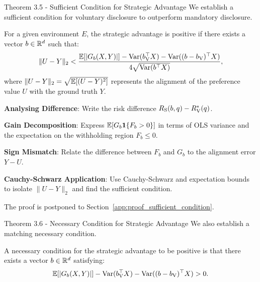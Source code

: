\begin{faqblock}
\faqanswers
{}
\end{faqblock}

\begin{sourceblock}{Theorem 3.5 - Sufficient Condition for Strategic Advantage}
We establish a sufficient condition for voluntary disclosure to outperform mandatory disclosure.
\begin{theorem}
\label{thm:sufficient_condition}
For a given environment $E$, the strategic advantage is positive if there exists a vector $b \in \mathbb{R}^d$ such that:
\begin{equation}
    \label{eq:sufficient_condition}
    \|U - Y\|_2 < \frac{\mathbb{E}[|G_b(X, Y)|] - \mathrm{Var}(b_{\mathrm{V}}^\top X) - \mathrm{Var}((b - b_{\mathrm{V}})^\top X)}{4\sqrt{\mathrm{Var}(b^\top X)}},
\end{equation}
where $\|U - Y\|_2 = \sqrt{\mathbb{E}[(U - Y)^2]}$ represents the alignment of the preference value $U$ with the ground truth $Y$.
\end{theorem}
\end{sourceblock}

\begin{guideblock}
\item \textbf{Analysing Difference}: Write the risk difference $R_{\mathrm{S}}(b, q) - R_{\mathrm{V}}^*(q)$.
\item \textbf{Gain Decomposition}: Express $\mathbb{E}[G_b \mathbf{1}\{F_b > 0\}]$ in terms of OLS variance and the expectation on the withholding region $F_b \le 0$.
\item \textbf{Sign Mismatch}: Relate the difference between $F_b$ and $G_b$ to the alignment error $Y - U$.
\item \textbf{Cauchy-Schwarz Application}: Use Cauchy-Schwarz and expectation bounds to isolate $\|U - Y\|_2$ and find the sufficient condition.
\end{guideblock}
The proof is postponed to Section~\ref{app:proof_sufficient_condition}.

\begin{sourceblock}{Theorem 3.6 - Necessary Condition for Strategic Advantage}
We also establish a matching necessary condition.
\begin{theorem}
\label{thm:necessary_condition}
A necessary condition for the strategic advantage to be positive is that there exists a vector $b \in \mathbb{R}^d$ satisfying:
\begin{equation}
    \label{eq:necessary_condition}
    \mathbb{E}[|G_b(X, Y)|] - \mathrm{Var}(b_{\mathrm{V}}^\top X) - \mathrm{Var}((b - b_{\mathrm{V}})^\top X) > 0.
\end{equation}
\end{theorem}
\end{sourceblock}

